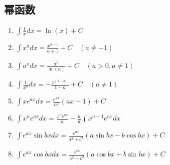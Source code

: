 \documentclass[10pt, a4paper, twocolumn]{article}
\begin{document}
\subsection{幂函数}
\begin{enumerate}
    \item $\int \frac{1}{x} dx = \ln(x) + C$
    \item $\int x^a dx = \frac{x^{a+1}}{a+1} + C \quad (a \neq -1)$
    \item $\int a^x dx = \frac{a^x}{\ln(a)} + C \quad (a > 0, a \neq 1)$
    \item $\int \frac{1}{x^a} dx = -\frac{x^{(1-a)}}{1-a} + C \quad (a \neq 1)$
    \item $\int xe^{ax} dx = \frac{e^{ax}}{a^2}(ax-1) + C$
    \item $\int x^n e^{ax} dx = \frac{x^n e^{ax}}{a} - \frac{n}{a}\int x^{n-1} e^{ax} dx$
    \item $\int e^{ax}\sin bx dx = \frac{e^{ax}}{a^2+b^2}(a\sin bx - b\cos bx) + C$
    \item $\int e^{ax}\cos bx dx = \frac{e^{ax}}{a^2+b^2}(a\cos bx + b\sin bx) + C$
\end{enumerate}
\end{document}
